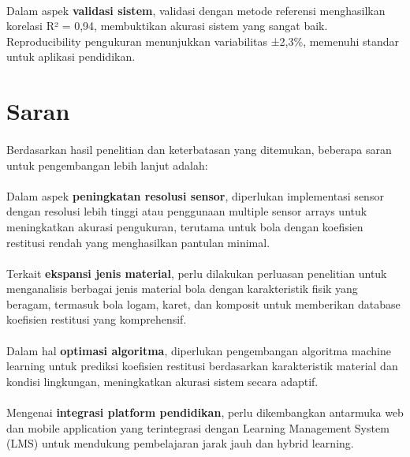 \paragraph{}Dalam aspek \textbf{validasi sistem}, validasi dengan metode referensi menghasilkan korelasi R² = 0,94, membuktikan akurasi sistem yang sangat baik. Reproducibility pengukuran menunjukkan variabilitas ±2,3\%, memenuhi standar untuk aplikasi pendidikan.

\section{Saran}

\paragraph{}Berdasarkan hasil penelitian dan keterbatasan yang ditemukan, beberapa saran untuk pengembangan lebih lanjut adalah:

\paragraph{}Dalam aspek \textbf{peningkatan resolusi sensor}, diperlukan implementasi sensor dengan resolusi lebih tinggi atau penggunaan multiple sensor arrays untuk meningkatkan akurasi pengukuran, terutama untuk bola dengan koefisien restitusi rendah yang menghasilkan pantulan minimal.

\paragraph{}Terkait \textbf{ekspansi jenis material}, perlu dilakukan perluasan penelitian untuk menganalisis berbagai jenis material bola dengan karakteristik fisik yang beragam, termasuk bola logam, karet, dan komposit untuk memberikan database koefisien restitusi yang komprehensif.

\paragraph{}Dalam hal \textbf{optimasi algoritma}, diperlukan pengembangan algoritma machine learning untuk prediksi koefisien restitusi berdasarkan karakteristik material dan kondisi lingkungan, meningkatkan akurasi sistem secara adaptif.

\paragraph{}Mengenai \textbf{integrasi platform pendidikan}, perlu dikembangkan antarmuka web dan mobile application yang terintegrasi dengan Learning Management System (LMS) untuk mendukung pembelajaran jarak jauh dan hybrid learning.

